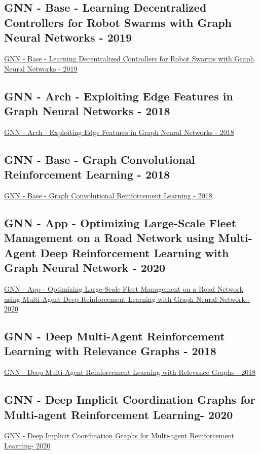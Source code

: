 \subsection{GNN - Base - Learning Decentralized Controllers for Robot Swarms with Graph Neural Networks - 2019}
\href{https://arxiv.org/abs/1903.10527}{GNN - Base - Learning Decentralized Controllers for Robot Swarms with Graph Neural Networks - 2019}

\subsection{GNN - Arch - Exploiting Edge Features in Graph Neural Networks - 2018}
\href{https://arxiv.org/abs/1809.02709}{GNN - Arch - Exploiting Edge Features in Graph Neural Networks - 2018}

\subsection{GNN - Base - Graph Convolutional Reinforcement Learning - 2018}
\href{https://arxiv.org/abs/1810.09202}{GNN - Base - Graph Convolutional Reinforcement Learning - 2018}

\subsection{GNN - App - Optimizing Large-Scale Fleet Management on a Road Network using Multi-Agent Deep Reinforcement Learning with Graph Neural Network - 2020}
\href{https://arxiv.org/abs/2011.06175}{GNN - App - Optimizing Large-Scale Fleet Management on a Road Network using Multi-Agent Deep Reinforcement Learning with Graph Neural Network - 2020}

\subsection{GNN - Deep Multi-Agent Reinforcement Learning with Relevance Graphs - 2018}
\href{https://arxiv.org/abs/1811.12557}{GNN - Deep Multi-Agent Reinforcement Learning with Relevance Graphs - 2018}

\subsection{GNN - Deep Implicit Coordination Graphs for Multi-agent Reinforcement Learning- 2020}
\href{https://arxiv.org/abs/2006.11438}{GNN - Deep Implicit Coordination Graphs for Multi-agent Reinforcement Learning- 2020}


